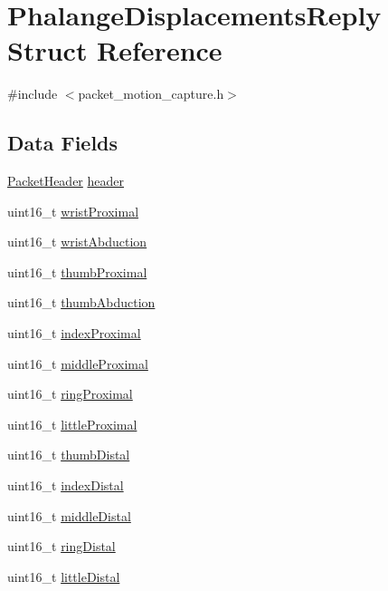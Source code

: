 \hypertarget{struct_phalange_displacements_reply}{}\section{Phalange\+Displacements\+Reply Struct Reference}
\label{struct_phalange_displacements_reply}


{\ttfamily \#include $<$packet\+\_\+motion\+\_\+capture.\+h$>$}

\subsection*{Data Fields}
\begin{DoxyCompactItemize}
\item 
\hyperlink{struct_packet_header}{Packet\+Header} \hyperlink{struct_phalange_displacements_reply_aaed6c168c58cb4f203b7f5623775d739}{header}
\item 
uint16\+\_\+t \hyperlink{struct_phalange_displacements_reply_a81aac7724e759c0739ff83925f92be36}{wrist\+Proximal}
\item 
uint16\+\_\+t \hyperlink{struct_phalange_displacements_reply_aa161a47616792dfde39295782d039c0c}{wrist\+Abduction}
\item 
uint16\+\_\+t \hyperlink{struct_phalange_displacements_reply_a919dcfbdd0a0a89dbfdd776d1b5a76de}{thumb\+Proximal}
\item 
uint16\+\_\+t \hyperlink{struct_phalange_displacements_reply_a022c111596c3d776956a21500c86f3fd}{thumb\+Abduction}
\item 
uint16\+\_\+t \hyperlink{struct_phalange_displacements_reply_a520b879012a09199540096a4a4f21e33}{index\+Proximal}
\item 
uint16\+\_\+t \hyperlink{struct_phalange_displacements_reply_a11fa12d320909ee75b01989a7b12b995}{middle\+Proximal}
\item 
uint16\+\_\+t \hyperlink{struct_phalange_displacements_reply_a1ae42a3b30f728c4cf2a24ab16e97b7b}{ring\+Proximal}
\item 
uint16\+\_\+t \hyperlink{struct_phalange_displacements_reply_a6d12289c17dcd8fe68837128c0174406}{little\+Proximal}
\item 
uint16\+\_\+t \hyperlink{struct_phalange_displacements_reply_a4d7c05fb3041a643e5750adaa35d9e69}{thumb\+Distal}
\item 
uint16\+\_\+t \hyperlink{struct_phalange_displacements_reply_a572308c44b340898cc8b0e0207bbd4e5}{index\+Distal}
\item 
uint16\+\_\+t \hyperlink{struct_phalange_displacements_reply_a23428081a4dcf870a466617fcfdb9a05}{middle\+Distal}
\item 
uint16\+\_\+t \hyperlink{struct_phalange_displacements_reply_a09562d3fe6c9dedc5f04d95fcf84b55b}{ring\+Distal}
\item 
uint16\+\_\+t \hyperlink{struct_phalange_displacements_reply_ade0a658d54d75d7ddb8f413c86a0159d}{little\+Distal}
\end{DoxyCompactItemize}


